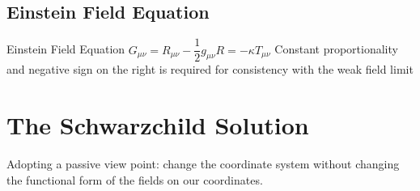 \documentclass[12pt,a4paper]{article}
\begin{document}
    \subsection{Einstein Field Equation}
    \begin{definition}
        {Einstein Field Equation}
        {$G_{\mu\nu}=R_{\mu\nu}-\dfrac{1}{2}g_{\mu\nu}R=-\kappa T_{\mu\nu}$}
        {Constant proportionality and negative sign on the right is required for consistency with the weak field limit}
    \end{definition}
\section{The Schwarzchild Solution}
Adopting a passive view point: change the coordinate system without changing the functional form of the fields on our coordinates.
\end{document}
